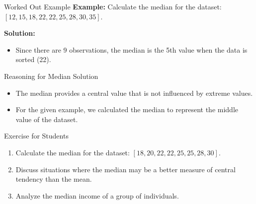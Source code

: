 \begin{frame}{Worked Out Example}
  \textbf{Example:} Calculate the median for the dataset: \([12, 15, 18, 22, 22, 25, 28, 30, 35]\).

  \textbf{Solution:}
  \begin{itemize}
    \item Since there are 9 observations, the median is the 5th value when the data is sorted (22).
  \end{itemize}
\end{frame}

\begin{frame}{Reasoning for Median Solution}
  \begin{itemize}
    \item The median provides a central value that is not influenced by extreme values.
    \item For the given example, we calculated the median to represent the middle value of the dataset.
  \end{itemize}
\end{frame}

\begin{frame}{Exercise for Students}
  \begin{enumerate}
    \item Calculate the median for the dataset: \([18, 20, 22, 22, 25, 25, 28, 30]\).
    \item Discuss situations where the median may be a better measure of central tendency than the mean.
    \item Analyze the median income of a group of individuals.
  \end{enumerate}
\end{frame}
